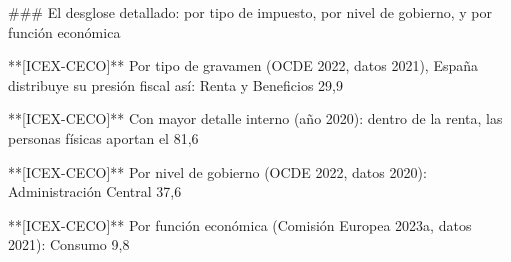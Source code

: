 \documentclass[10pt,a4paper]{article}
\begin{document}
### El desglose detallado: por tipo de impuesto, por nivel de gobierno, y por función económica

**[ICEX-CECO]** Por tipo de gravamen (OCDE 2022, datos 2021), España distribuye su presión fiscal así: Renta y Beneficios 29,9%

**[ICEX-CECO]** Con mayor detalle interno (año 2020): dentro de la renta, las personas físicas aportan el 81,6%

**[ICEX-CECO]** Por nivel de gobierno (OCDE 2022, datos 2020): Administración Central 37,6%

**[ICEX-CECO]** Por función económica (Comisión Europea 2023a, datos 2021): Consumo 9,8%
\end{document}
